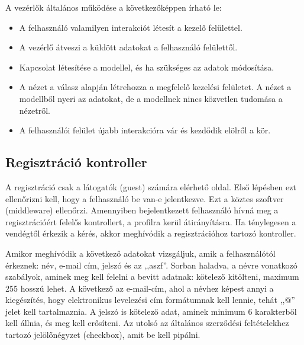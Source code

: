 \documentclass[
]{thesis-ekf}
\theoremstyle{definition}
\theoremstyle{remark}
\begin{document}
	A vezérlők általános működése a következőképpen írható le:
	\begin{itemize}
		\item{A felhasználó valamilyen interakciót létesít a kezelő felülettel.}
		\item{A vezérlő átveszi a küldött adatokat a felhasználó felülettől.}
		\item{Kapcsolat létesítése a modellel, és ha szükséges az adatok módosítása.}
		\item{ A nézet a válasz alapján létrehozza a megfelelő kezelési felületet. A nézet a modellből nyeri az adatokat, de a modellnek nincs közvetlen tudomása a nézetről.}
		\item{A felhasználói felület újabb interakcióra vár és kezdődik elölről a kör.}~\cite{controller_cicle}
	\end{itemize}
	
	\subsection{Regisztráció kontroller}
	A regisztráció csak a látogatók (guest) számára elérhető oldal. Első lépésben ezt ellenőrizni kell, hogy a felhasználó be van-e jelentkezve. Ezt a köztes szoftver (middleware) ellenőrzi. Amennyiben bejelentkezett felhasználó hívná meg a regisztrációért felelős kontrollert, a profilra kerül átirányításra. Ha ténylegesen a vendégtől érkezik a kérés, akkor meghívódik a regisztrációhoz tartozó kontroller.  
	
	Amikor meghívódik a következő adatokat vizsgáljuk, amik a felhasználótól érkeznek: név, e-mail cím, jelszó és az ,,aszf''.
	Sorban haladva, a névre vonatkozó szabályok, aminek meg kell felelni a bevitt adatnak: kötelező kitölteni, maximum 255 hosszú lehet. A következő az e-mail-cím, ahol a névhez képest annyi a kiegészítés, hogy elektronikus levelezési cím formátumnak kell lennie, tehát ,,@'' jelet kell tartalmaznia.
	A jelszó is kötelező adat, aminek minimum 6 karakterből kell állnia, és meg kell erősíteni. Az utolsó az általános szerződési feltételekhez tartozó jelölőnégyzet (checkbox), amit be kell pipálni.
	
\end{document}
